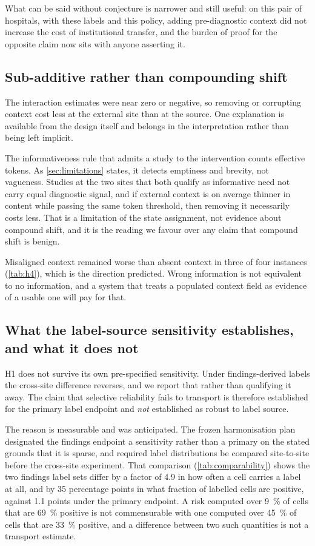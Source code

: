What can be said without conjecture is narrower and still useful: on this pair
of hospitals, with these labels and this policy, adding pre-diagnostic context
did not increase the cost of institutional transfer, and the burden of proof for
the opposite claim now sits with anyone asserting it.

\subsection{Sub-additive rather than compounding shift}

The interaction estimates were near zero or negative, so removing or corrupting
context cost less at the external site than at the source. One explanation is
available from the design itself and belongs in the interpretation rather than
being left implicit.

The informativeness rule that admits a study to the intervention counts
effective tokens. As \cref{sec:limitations} states, it detects emptiness and
brevity, not vagueness. Studies at the two sites that both qualify as
informative need not carry equal diagnostic signal, and if external context is
on average thinner in content while passing the same token threshold, then
removing it necessarily costs less. That is a limitation of the state
assignment, not evidence about compound shift, and it is the reading we favour
over any claim that compound shift is benign.

Misaligned context remained worse than absent context in three of four
instances (\cref{tab:h4}), which is the direction predicted. Wrong information
is not equivalent to no information, and a system that treats a populated
context field as evidence of a usable one will pay for that.

\subsection{What the label-source sensitivity establishes, and what it does not}
\label{sec:s1-discussion}

H1 does not survive its own pre-specified sensitivity. Under findings-derived
labels the cross-site difference reverses, and we report that rather than
qualifying it away. The claim that selective reliability fails to transport is
therefore established for the primary label endpoint and \emph{not} established
as robust to label source.

The reason is measurable and was anticipated. The frozen harmonisation plan
designated the findings endpoint a sensitivity rather than a primary on the
stated grounds that it is sparse, and required label distributions be compared
site-to-site before the cross-site experiment. That comparison
(\cref{tab:comparability}) shows the two findings label sets differ by a factor
of \num{4.9} in how often a cell carries a label at all, and by \num{35}
percentage points in what fraction of labelled cells are positive, against
\num{1.1} points under the primary endpoint. A risk computed over
\SI{9}{\percent} of cells that are \SI{69}{\percent} positive is not commensurable
with one computed over \SI{45}{\percent} of cells that are \SI{33}{\percent}
positive, and a difference between two such quantities is not a transport
estimate.

